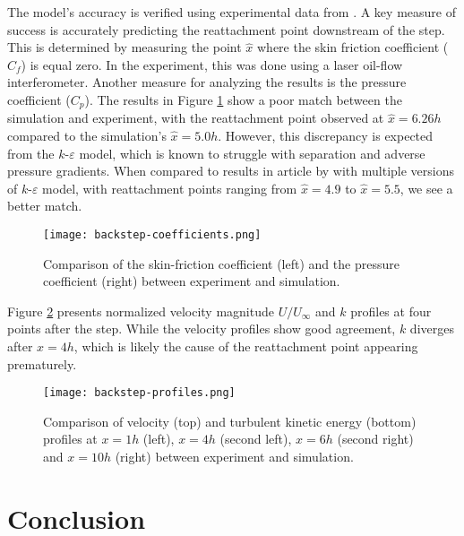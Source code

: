 The model's accuracy is verified using experimental data from \cite{driver_features_1985}. A key measure of success is accurately predicting the reattachment point downstream of the step. This is determined by measuring the point \(\hat{x}\) where the skin friction coefficient (\(C_f\)) is equal zero. In the experiment, this was done using a laser oil-flow interferometer. Another measure for analyzing the results is the pressure coefficient (\(C_p\)). The results in Figure \ref{fig: backstep coefficients} show a poor match between the simulation and experiment, with the reattachment point observed at \(\hat{x} = 6.26 h\) compared to the simulation's \(\hat{x} = 5.0 h\). However, this discrepancy is expected from the \(k\)-\(\varepsilon\) model, which is known to struggle with separation and adverse pressure gradients. When compared to results in article by \cite{steffen_jr._critical_1993} with multiple versions of \(k\)-\(\varepsilon\) model, with reattachment points ranging from \(\hat{x} = 4.9\) to \(\hat{x} = 5.5\), we see a better match.

\begin{figure}[htbp]
    \centering
    \texttt{[image: backstep-coefficients.png]}
    \captionsetup{width=0.85\textwidth}
    \caption{Comparison of the skin-friction coefficient (left) and the pressure coefficient (right) between experiment and simulation.}
    \label{fig: backstep coefficients}
\end{figure}

Figure \ref{fig: backstep profiles} presents normalized velocity magnitude \(U/U_\infty\) and \(k\) profiles at four points after the step. While the velocity profiles show good agreement, \(k\) diverges after \(x = 4h\), which is likely the cause of the reattachment point appearing prematurely. 

\begin{figure}[htbp]
    \centering
    \texttt{[image: backstep-profiles.png]}
    \captionsetup{width=0.85\textwidth}
    \caption{Comparison of velocity (top) and turbulent kinetic energy (bottom) profiles at \(x = 1h\) (left), \(x = 4h\) (second left), \(x = 6h\) (second right) and \(x = 10h\) (right) between experiment and simulation.}
    \label{fig: backstep profiles}
\end{figure}

\section{Conclusion}

